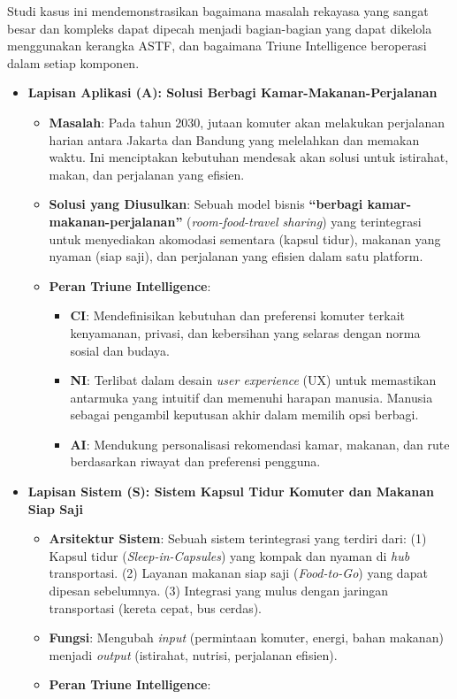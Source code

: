 \documentclass[
  letterpaper,
  DIV=11,
  numbers=noendperiod]{scrreprt}
\providecommand{\tightlist}{%
  \setlength{\itemsep}{0pt}\setlength{\parskip}{0pt}}
\begin{document}
Studi kasus ini mendemonstrasikan bagaimana masalah rekayasa yang sangat
besar dan kompleks dapat dipecah menjadi bagian-bagian yang dapat
dikelola menggunakan kerangka ASTF, dan bagaimana Triune Intelligence
beroperasi dalam setiap komponen.

\begin{itemize}
\tightlist
\item
  \textbf{Lapisan Aplikasi (A): Solusi Berbagi Kamar-Makanan-Perjalanan}

  \begin{itemize}
  \tightlist
  \item
    \textbf{Masalah}: Pada tahun 2030, jutaan komuter akan melakukan
    perjalanan harian antara Jakarta dan Bandung yang melelahkan dan
    memakan waktu. Ini menciptakan kebutuhan mendesak akan solusi untuk
    istirahat, makan, dan perjalanan yang efisien.
  \item
    \textbf{Solusi yang Diusulkan}: Sebuah model bisnis
    \textbf{``berbagi kamar-makanan-perjalanan''}
    (\emph{room-food-travel sharing}) yang terintegrasi untuk
    menyediakan akomodasi sementara (kapsul tidur), makanan yang nyaman
    (siap saji), dan perjalanan yang efisien dalam satu platform.
  \item
    \textbf{Peran Triune Intelligence}:

    \begin{itemize}
    \tightlist
    \item
      \textbf{CI}: Mendefinisikan kebutuhan dan preferensi komuter
      terkait kenyamanan, privasi, dan kebersihan yang selaras dengan
      norma sosial dan budaya.
    \item
      \textbf{NI}: Terlibat dalam desain \emph{user experience} (UX)
      untuk memastikan antarmuka yang intuitif dan memenuhi harapan
      manusia. Manusia sebagai pengambil keputusan akhir dalam memilih
      opsi berbagi.
    \item
      \textbf{AI}: Mendukung personalisasi rekomendasi kamar, makanan,
      dan rute berdasarkan riwayat dan preferensi pengguna.
    \end{itemize}
  \end{itemize}
\item
  \textbf{Lapisan Sistem (S): Sistem Kapsul Tidur Komuter dan Makanan
  Siap Saji}

  \begin{itemize}
  \tightlist
  \item
    \textbf{Arsitektur Sistem}: Sebuah sistem terintegrasi yang terdiri
    dari: (1) Kapsul tidur (\emph{Sleep-in-Capsules}) yang kompak dan
    nyaman di \emph{hub} transportasi. (2) Layanan makanan siap saji
    (\emph{Food-to-Go}) yang dapat dipesan sebelumnya. (3) Integrasi
    yang mulus dengan jaringan transportasi (kereta cepat, bus cerdas).
  \item
    \textbf{Fungsi}: Mengubah \emph{input} (permintaan komuter, energi,
    bahan makanan) menjadi \emph{output} (istirahat, nutrisi, perjalanan
    efisien).
  \item
    \textbf{Peran Triune Intelligence}:


\end{itemize}
\end{itemize}
\end{document}
